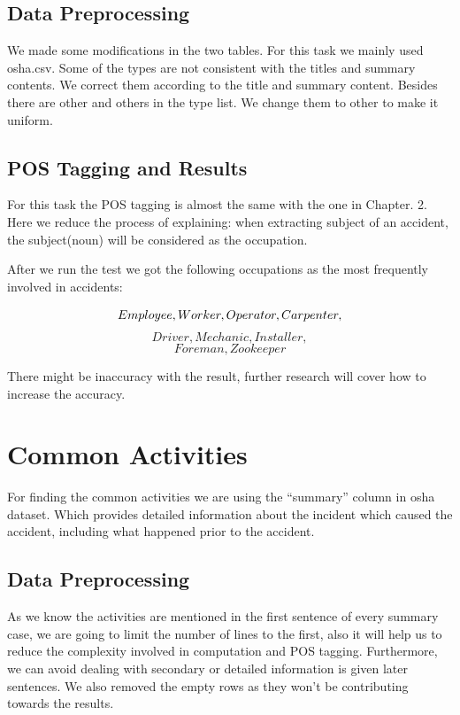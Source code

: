 \documentclass[DIV=calc, paper=a4, fontsize=11pt, twocolumn]{scrartcl}	 %
\begin{document}
\subsection{Data Preprocessing}
We made some modifications in the two tables. For this task we mainly
used osha.csv. Some of the types are not consistent with the titles
and summary contents. We correct them according to the title and
summary content. Besides there are other and others in the type
list. We change them to other to make it uniform.


\subsection{POS Tagging and Results}

For this task the POS tagging is almost the same with the one in
Chapter. 2. Here we reduce the process of explaining: when extracting
subject of an accident, the subject(noun) will be considered as the
occupation.

After we run the test we got the following occupations as the most
frequently involved in accidents:

{\bf $$\small Employee, Worker, Operator, Carpenter,$$
$$Driver, Mechanic, Installer,$$
$$Foreman, Zookeeper$$}

There might be inaccuracy with the result, further research will cover
how to increase the accuracy.


\section{Common Activities}

For finding the common activities we are using the “summary” column in
osha dataset. Which provides detailed information about the incident
which caused the accident, including what happened prior to the
accident.


\subsection{Data Preprocessing}

As we know the activities are mentioned in the first sentence of every summary case, we are going to limit the number of lines to the first, also it will help us to reduce the complexity involved in computation and POS tagging. Furthermore, we can avoid dealing with secondary or detailed information is given later sentences.
We also removed the empty rows as they won’t be contributing towards
the results.
\end{document}
